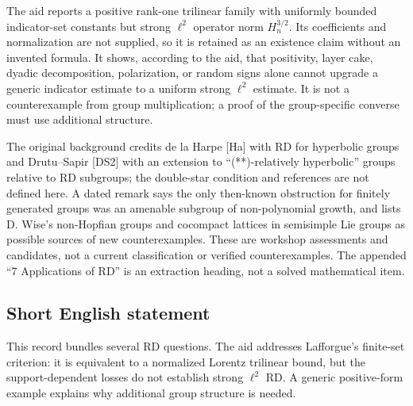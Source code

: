 \documentclass[11pt]{article}
\begin{document}
The aid reports a positive rank-one trilinear family with uniformly bounded indicator-set constants but strong \(\ell^2\) operator norm \(H_n^{3/2}\). Its coefficients and normalization are not supplied, so it is retained as an existence claim without an invented formula. It shows, according to the aid, that positivity, layer cake, dyadic decomposition, polarization, or random signs alone cannot upgrade a generic indicator estimate to a uniform strong \(\ell^2\) estimate. It is not a counterexample from group multiplication; a proof of the group-specific converse must use additional structure.

The original background credits de la Harpe [Ha] with RD for hyperbolic groups and Drutu--Sapir [DS2] with an extension to ``(**)-relatively hyperbolic'' groups relative to RD subgroups; the double-star condition and references are not defined here. A dated remark says the only then-known obstruction for finitely generated groups was an amenable subgroup of non-polynomial growth, and lists D. Wise's non-Hopfian groups and cocompact lattices in semisimple Lie groups as possible sources of new counterexamples. These are workshop assessments and candidates, not a current classification or verified counterexamples. The appended ``7 Applications of RD'' is an extraction heading, not a solved mathematical item.
\subsection{Short English statement}
This record bundles several RD questions. The aid addresses Lafforgue's finite-set criterion: it is equivalent to a normalized Lorentz trilinear bound, but the support-dependent losses do not establish strong \(\ell^2\) RD. A generic positive-form example explains why additional group structure is needed.
\end{document}
